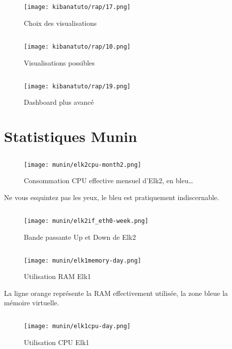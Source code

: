 \subsection{}
\begin{figure}[H]
\center
\texttt{[image: kibanatuto/rap/17.png]}
\label{fig:kibanatuto10}
\caption{Choix des visualisations}
\end{figure}
\subsection{}
\begin{figure}[H]
\center
\texttt{[image: kibanatuto/rap/10.png]}
\label{fig:kibanatuto7}
\caption{Visualisations possibles}
\end{figure}
\subsection{}
\begin{figure}[H]
\center
\texttt{[image: kibanatuto/rap/19.png]}
\label{fig:kibanatuto12}
\caption{Dashboard plus avancé}
\end{figure}

\section{Statistiques Munin}
\subsection{}
\begin{figure}[H]
\center
\texttt{[image: munin/elk2cpu-month2.png]}
\label{fig:elk2cpu}
\caption{Consommation CPU effective mensuel d'Elk2, en bleu\ldots}
\end{figure}
Ne vous esquintez pas les yeux, le bleu est pratiquement indiscernable.

\subsection{}
\begin{figure}[H]
\center
\texttt{[image: munin/elk2if\_eth0-week.png]}
\label{fig:elk2eth0}
\caption{Bande passante Up et Down de Elk2}
\end{figure}
\subsection{}
\begin{figure}[H]
\center
\texttt{[image: munin/elk1memory-day.png]}
\label{fig:elk1memory}
\caption{Utilisation RAM Elk1}
\end{figure}
La ligne orange représente la RAM effectivement utilisée, la zone bleue la mémoire virtuelle.
\subsection{}
\begin{figure}[H]
\center
\texttt{[image: munin/elk1cpu-day.png]}
\label{fig:elk1cpu}
\caption{Utilisation CPU Elk1}
\end{figure}

